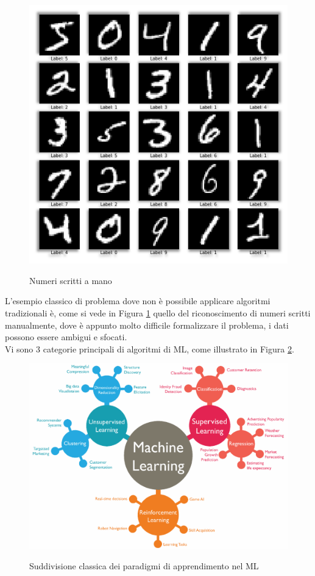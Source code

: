 \begin{figure}[H]
    \centering
    \includegraphics[alt={Numeri scritti a mano}, width=1\columnwidth]{img/handwritten-digit-recognition.png}
    \caption{Numeri scritti a mano}
    \label{fig:digit-recognition}
\end{figure}

L'esempio classico di problema dove non è possibile applicare algoritmi tradizionali è, come si vede in Figura \ref{fig:digit-recognition} quello del riconoscimento di numeri scritti manualmente, dove è appunto molto difficile formalizzare il problema, i dati possono essere ambigui e sfocati.\\

Vi sono 3 categorie principali di algoritmi di ML, come illustrato in Figura \ref{fig:ml-paradigms}.

\begin{figure}[H]
    \centering
    \includegraphics[alt={Suddivisione classica dei paradigmi di apprendimento nel ML}, width=1\columnwidth]{img/paradigmi-ml.png}
    \caption{Suddivisione classica dei paradigmi di apprendimento nel ML}
    \label{fig:ml-paradigms}
\end{figure}

